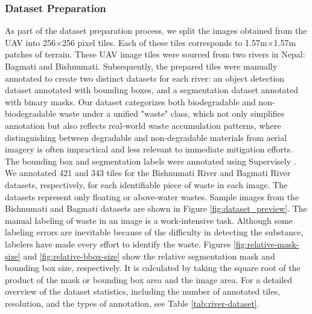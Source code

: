 \documentclass{ieeeaccess}
\begin{document}
\vspace{0.3cm}
\subsubsection{Dataset Preparation}
\label{sec:dataset_prep}
As part of the dataset preparation process, we split the images obtained from the UAV into 256$\times$256 pixel tiles. Each of these tiles corresponds to 1.57m$\times$1.57m patches of terrain. These UAV image tiles were sourced from two rivers in Nepal: Bagmati and Bishnumati. Subsequently, the prepared tiles were manually annotated to create two distinct datasets for each river: an object detection dataset annotated with bounding boxes, and a segmentation dataset annotated with binary masks. Our dataset categorizes both biodegradable and non-biodegradable waste under a unified "waste" class, which not only simplifies annotation but also reflects real-world waste accumulation patterns, where distinguishing between degradable and non-degradable materials from aerial imagery is often impractical and less relevant to immediate mitigation efforts. The bounding box and segmentation labels were annotated using Supervisely \cite{supervisely}. We annotated 421 and 343 tiles for the Bishnumati River and Bagmati River datasets, respectively, for each identifiable piece of waste in each image. The datasets represent only floating or above-water wastes. Sample images from the Bishnumati and Bagmati datasets are shown in Figure \ref{fig:dataset_preview}. The manual labeling of waste in an image is a work-intensive task. Although some labeling errors are inevitable because of the difficulty in detecting the substance, labelers have made every effort to identify the waste. Figures \ref{fig:relative-mask-size} and \ref{fig:relative-bbox-size} show the relative segmentation mask and bounding box size, respectively. It is calculated by taking the square root of the product of the mask or bounding box area and the image area. For a detailed overview of the dataset statistics, including the number of annotated tiles, resolution, and the types of annotation, see Table \ref{tab:river-dataset}.
\end{document}
